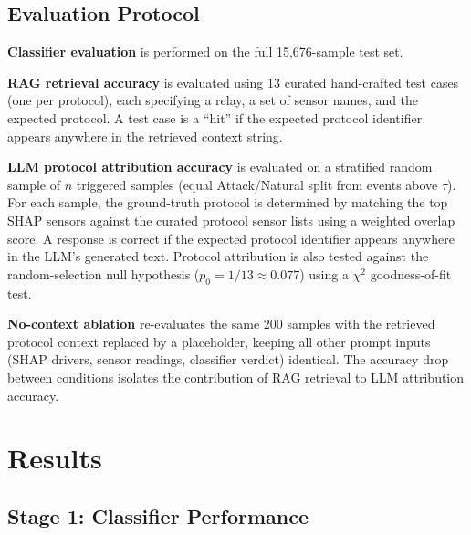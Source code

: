 \documentclass[twocolumn, 10pt, letterpaper]{article}
\begin{document}
\subsection{Evaluation Protocol}

\textbf{Classifier evaluation} is performed on the full 15,676-sample test set.

\textbf{RAG retrieval accuracy} is evaluated using 13 curated hand-crafted test cases
(one per protocol), each specifying a relay, a set of sensor names, and the
expected protocol. A test case is a ``hit'' if the expected protocol identifier
appears anywhere in the retrieved context string.

\textbf{LLM protocol attribution accuracy} is evaluated on a stratified random sample
of $n$ triggered samples (equal Attack/Natural split from events above $\tau$).
For each sample, the ground-truth protocol is determined by matching the top SHAP
sensors against the curated protocol sensor lists using a weighted overlap score.
A response is correct if the expected protocol identifier appears anywhere in the
LLM's generated text.
Protocol attribution is also tested against the random-selection null hypothesis
($p_0 = 1/13 \approx 0.077$) using a $\chi^2$ goodness-of-fit test.

\textbf{No-context ablation} re-evaluates the same 200 samples with the retrieved
protocol context replaced by a placeholder, keeping all other prompt inputs
(SHAP drivers, sensor readings, classifier verdict) identical.
The accuracy drop between conditions isolates the contribution of RAG
retrieval to LLM attribution accuracy.

\section{Results}
\label{sec:results}

\subsection{Stage 1: Classifier Performance}
\end{document}
